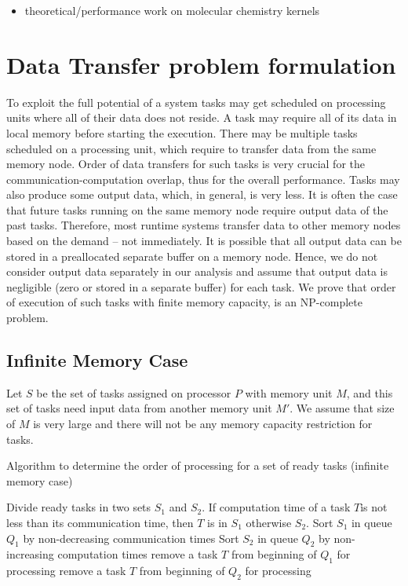 \documentclass[runningheads]{llncs} %
\begin{document}
\begin{itemize}
	\item theoretical/performance work on molecular chemistry kernels
\end{itemize}


	\section{Data Transfer problem formulation}
	
	To exploit the full potential of a system tasks may get scheduled on processing
	units where all of their data does not reside. A task may require all of its data
	in local memory before starting the execution. There may be multiple tasks
	scheduled on a processing unit, which require to transfer data from the same
	memory node. Order of data transfers for such tasks is very crucial for the
	communication-computation overlap, thus for the overall performance. Tasks may
	also produce some output data, which, in general, is very less.  It is often the case that future tasks running on the same memory node require output data of the past tasks. Therefore, most runtime systems transfer data to other memory nodes based on the demand -- not immediately. It is possible that all output data can be stored in a preallocated separate buffer on a memory node. Hence, we do not consider output data separately in our analysis and assume that output data is negligible (zero or stored in a separate buffer) for each task. We prove that order of execution of such tasks with finite memory capacity, is an NP-complete problem.
	
	
	\subsection{Infinite Memory Case}
	Let $S$ be the set of tasks assigned on processor $P$ with memory unit $M$, and this set of tasks  need input data from another memory unit $M'$. We assume that size of $M$ is very large and there will not be any memory capacity restriction for tasks.
	
	
	\begin{algorithm}
	\caption{\label{alg:OrderOfExecutionInfinteMemory}Algorithm to determine the order of processing for a set of ready tasks (infinite memory case)}
	\begin{algorithmic}[1]
		\STATE Divide ready tasks in two sets $S_1$ and $S_2$. If computation time of a task $T$is not less than its communication time, then $T$ is in $S_1$ otherwise $S_2$.
		\STATE Sort $S_1$ in queue $Q_1$ by non-decreasing communication times
		\STATE Sort $S_2$ in queue $Q_2$ by non-increasing computation times
		\STATE remove a task $T$ from beginning of $Q_1$ for processing
		\ELSE 
		\STATE remove a task $T$ from beginning of $Q_2$ for processing
		\ENDIF
		\ENDWHILE
	\end{algorithmic}
\end{algorithm}
	
\end{document}
